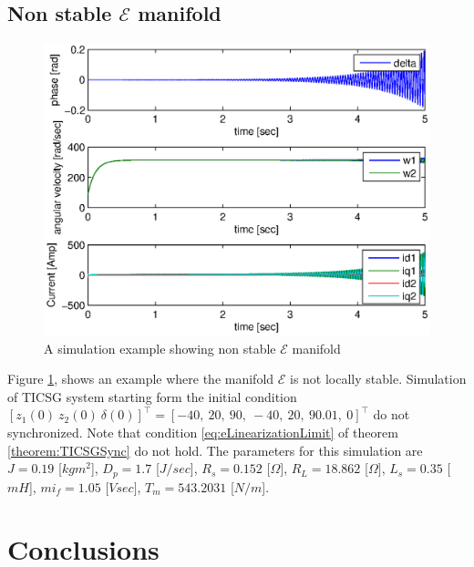 \documentclass[letterpaper, 10 pt, conference]{ieeeconf}
\begin{document}
\subsection{Non stable $\mathscr{E}$ manifold}
\begin{figure}[ht]
\includegraphics[scale=0.65]{NonStableTICSGSimulation}

\caption{A simulation example showing non stable $\mathscr{E}$ manifold}
\label{fig:NonStableTICSGSimulation}
\end{figure}
Figure \ref{fig:NonStableTICSGSimulation}, shows an example where the  manifold $\mathscr{E}$ is not locally stable. Simulation of TICSG system starting form the  initial condition $\left[z_1(0)\ z_2(0) \ \delta(0) \right]^\top = \left[ -40, \  20, \  90, \   -40, \ 20, \  90.01, \ 0 \right]^\top$ do not synchronized. Note that condition \eqref{eq:eLinearizationLimit} of theorem \ref{theorem:TICSGSync} do not hold. The parameters for this
simulation are $J=0.19$ {[}$kgm^{2}${]}, $D_{p}=1.7$ {[}$J/sec${]},
$R_{s}=0.152$ {[}$\Omega]$,
$R_{L}=18.862$ {[}$\Omega]$, $L_{s}=0.35$ {[}$mH${]}, $mi_{f}=1.05$
{[}$Vsec]$, $T_{m}=543.2031$ {[}$N/m${]}.
%

\section{Conclusions}
\end{document}
